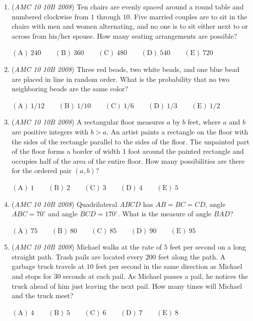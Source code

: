 \begin{enumerate}
 $\mathrm{(A)}\ 5/18\qquad\mathrm{(B)}\ 7/18\qquad\mathrm{(C)}\ 11/18\qquad\mathrm{(D)}\ 3/4\qquad\mathrm{(E)}\ 8/9$


	\item (\textit{AMC 10 10B 2008}) Ten chairs are evenly spaced around a round table  and numbered clockwise from $1$ through $10$. Five married couples are to sit in the chairs with men and women alternating, and no one is to sit either next to or across from his/her spouse. How many seating arrangements are possible?


 $\mathrm{(A)}\ 240\qquad\mathrm{(B)}\ 360\qquad\mathrm{(C)}\ 480\qquad\mathrm{(D)}\ 540\qquad\mathrm{(E)}\ 720$


	\item (\textit{AMC 10 10B 2008}) Three red beads, two white beads, and one blue bead are placed in line in random order. What is the probability that no two neighboring beads are the same color?


 $\mathrm{(A)}\ 1/12\qquad\mathrm{(B)}\ 1/10\qquad\mathrm{(C)}\ 1/6\qquad\mathrm{(D)}\ 1/3\qquad\mathrm{(E)}\ 1/2$


	\item (\textit{AMC 10 10B 2008}) A rectangular floor measures $a$ by $b$ feet, where $a$ and $b$ are positive integers with $b > a$. An artist paints a rectangle on the floor with the sides of the rectangle parallel to the sides of the floor. The unpainted part of the floor forms a border of width 1 foot around the painted
rectangle and occupies half of the area of the entire floor. How many possibilities are there for the ordered pair $(a, b)$?


 $\mathrm{(A)}\ 1\qquad\mathrm{(B)}\ 2\qquad\mathrm{(C)}\ 3\qquad\mathrm{(D)}\ 4\qquad\mathrm{(E)}\ 5$


	\item (\textit{AMC 10 10B 2008}) Quadrilateral $ABCD$ has $AB = BC = CD$, angle $ABC = 70^\circ$ and angle $BCD = 170^\circ$. What is the measure of angle $BAD$?


 $\mathrm{(A)}\ 75\qquad\mathrm{(B)}\ 80\qquad\mathrm{(C)}\ 85\qquad\mathrm{(D)}\ 90\qquad\mathrm{(E)}\ 95$


	\item (\textit{AMC 10 10B 2008}) Michael walks at the rate of $5$ feet per second on a long straight path. Trash pails are located every $200$ feet along the path. A garbage truck travels at $10$ feet per second in the same direction as Michael and stops for $30$ seconds at each pail. As Michael passes a pail, he notices the truck ahead of him just leaving the next pail. How many times will Michael and the truck meet? 


 $\mathrm{(A)}\ 4\qquad\mathrm{(B)}\ 5\qquad\mathrm{(C)}\ 6\qquad\mathrm{(D)}\ 7\qquad\mathrm{(E)}\ 8$


\end{enumerate}